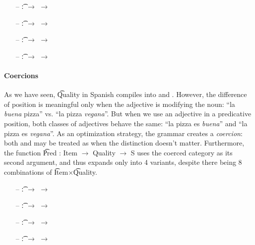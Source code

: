 \begin{itemize}
\setlength\itemsep{0em}
\item[--]  \t{:}  $\rightarrow$  $\rightarrow$ 
\item[--]   \t{:}  $\rightarrow$  $\rightarrow$ 
\item[--]  \t{:}  $\rightarrow$  $\rightarrow$ 
\item[--]  \t{:}  $\rightarrow$  $\rightarrow$ 
\end{itemize}


\paragraph{Coercions}
\label{sec:Coercions}
As we have seen, \t{Quality} in Spanish compiles into  and
. However, the difference of position is meaningful only when the
adjective is modifying the noun: ``la \emph{buena} pizza'' vs. ``la pizza
\emph{vegana}''. But when we use an adjective in a predicative position, both
classes of adjectives behave the same: ``la pizza es \emph{buena}''
and ``la pizza es \emph{vegana}''. As an optimization strategy, the
grammar creates a {\it coercion}: both  and 
may be treated as \quality{*} when the distinction doesn't matter. 
Furthermore, the function \t{Pred : Item $\rightarrow$ Quality $\rightarrow$ S} uses
the coerced category \quality{*} as its second argument, and thus
expands only into 4 variants, despite there being 8 combinations of
\t{Item}$\times$\t{Quality}.

\begin{itemize}
\setlength\itemsep{0em}
\item[--]  \t{:}  $\rightarrow$ \quality{*} $\rightarrow$ \comment
\item[--]   \t{:}  $\rightarrow$ \quality{*} $\rightarrow$ \comment
\item[--]   \t{:}  $\rightarrow$ \quality{*} $\rightarrow$ \comment
\item[--]  \t{:}  $\rightarrow$ \quality{*} $\rightarrow$ \comment
\end{itemize}



